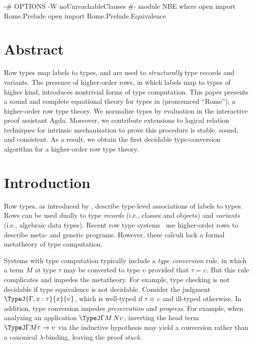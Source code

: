 
\InlineOn{}

\maketitle

\begin{code}[hide]
{-# OPTIONS -W noUnreachableClauses #-}
module NBE where 
open import Rome.Prelude
open import Rome.Prelude.Equivalence
\end{code}


\section*{Abstract}
Row types map labels to types, and are used to \emph{structurally} type records and variants. The presence of higher-order rows, in which labels map to types of higher kind, introduces nontrivial forms of type computation. This paper presents a sound and complete equational theory for types in \Rome{} (pronounced ``Rome''), a higher-order row type theory. We normalize \Rome{} types by evaluation in the interactive proof assistant Agda. Moreover, we contribute extensions to logical relation techniques for intrinsic mechanization to prove this procedure is stable, sound, and consistent. As a result, we obtain the first decidable type-conversion algorithm for a higher-order row type theory.


\section{Introduction}
Row types, as introduced by \citet{wand87}, describe type-level associations of labels to types. Rows can be used dually to type \emph{records} (i.e., classes and objects) and \emph{variants} (i.e., algebraic data types). Recent row type systems~\citep{HubersM23,Chlipala10,Chlipala16, TooheyCJX26} use higher-order rows to describe meta- and generic programs. However, these calculi lack a formal metatheory of type computation.

Systems with type computation typically include a \emph{type conversion} rule, in which a term $M$ at type $\tau$ may be converted to type $\upsilon$ provided that $\tau = \upsilon$. But this rule complicates and impedes the metatheory. For example, type checking is not decidable if type equivalence is not decidable. Consider the judgment $\TypeJ {\Gamma, x : \tau} {x} {\upsilon}$, which is well-typed if $\tau \equiv \upsilon$ and ill-typed otherwise. In addition, type conversion impedes \emph{preservation} and \emph{progress}. For example, when analyzing an application $\TypeJ \Gamma {M\, N} {\upsilon}$, inverting the head term $\TypeJ \Gamma M {\tau \to \upsilon}$  via the inductive hypothesis may yield a conversion rather than a canonical $\lambda$-binding, leaving the proof \emph{stuck}.

